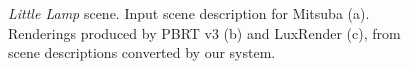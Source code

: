 \begin{figure}
	\centering
	\caption{\textit{Little Lamp} scene. Input scene description for Mitsuba (a).
		Renderings produced by PBRT v3 (b) and LuxRender (c),
		from scene descriptions converted by our system. }
	\label{fig:lamp}
\end{figure}

